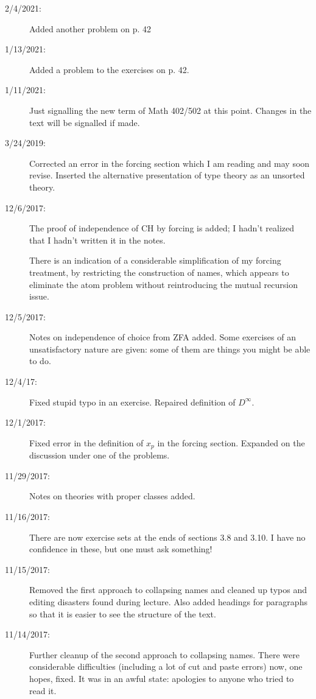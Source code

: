 \documentclass[12pt]{book}
\begin{document}
{\begin{description}
\item[2/4/2021:]  Added another problem on p. 42

\item[1/13/2021:]  Added a problem to the exercises on p. 42.

\item[1/11/2021:]  Just signalling the new term of Math 402/502 at this point.  Changes in the text will be signalled if made.

\item[3/24/2019:]  Corrected an error in the forcing section which I am reading and may soon revise.  Inserted the alternative presentation of type theory as an unsorted theory.

\item[12/6/2017:]  The proof of independence of CH by forcing is added;  I hadn't realized that I hadn't written it in the notes.

There is an indication of a considerable simplification of my forcing treatment, by restricting the construction of names, which appears to eliminate the atom problem without reintroducing the mutual recursion issue.

\item[12/5/2017:]  Notes on independence of choice from ZFA added.  Some exercises of an unsatisfactory nature are given:  some of them are things you might be able to do.

\item[12/4/17:]  Fixed stupid typo in an exercise.  Repaired definition of $D^{\infty}$.

\item[12/1/2017:]  Fixed error in the definition of $x_p$ in the forcing section.  Expanded on the discussion under one of the problems.

\item[11/29/2017:]  Notes on theories with proper classes added.

\item[11/16/2017:]  There are now exercise sets at the ends of sections 3.8 and 3.10.  I have no confidence in these, but one must ask something!

\item[11/15/2017:]  Removed the first approach to collapsing names and cleaned up typos and editing disasters found during lecture.   Also added headings for paragraphs so that it is easier to see the structure of the text.

\item[11/14/2017:]  Further cleanup of the second approach to collapsing names.  There were considerable difficulties (including a lot of cut and paste errors) now, one hopes, fixed.  It was in an awful state:  apologies to anyone who tried to read it.


\end{description}}
\end{document}
